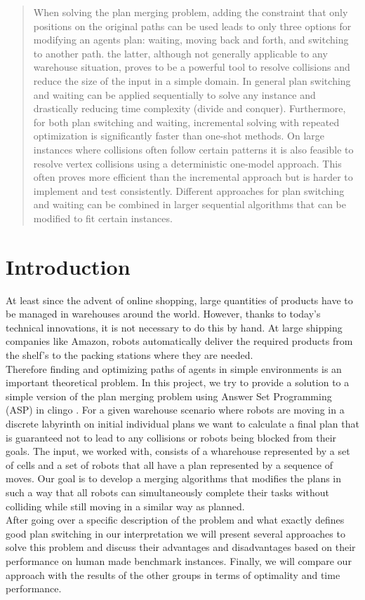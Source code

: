 \documentclass{llncs}
\begin{document}
\tableofcontents
\newpage
\begin{abstract}
When solving the plan merging problem, adding the constraint that only positions on the original paths can be used leads to only three options for modifying an agents plan: waiting, moving back and forth, and switching to another path. the latter, although not generally applicable to any warehouse situation, proves to be a powerful tool to resolve collisions and reduce the size of the input in a simple domain. In general plan switching and waiting can be applied sequentially to solve any instance and drastically reducing time complexity (divide and conquer). Furthermore, for both plan switching and waiting, incremental solving with repeated optimization is significantly faster than one-shot methods. On large instances where collisions often follow certain patterns it is also feasible to resolve vertex collisions using a deterministic one-model approach. This often proves more efficient than the incremental approach but is harder to implement and test consistently. Different approaches for plan switching and waiting can be combined in larger sequential algorithms that can be modified to fit certain instances.
\end{abstract}
\setcounter{page}{1}
\section{Introduction}
At least since the advent of online shopping, large quantities of products have to be managed in warehouses around the world. However, thanks to today's technical innovations, it is not necessary to do this by hand. At large shipping companies like Amazon, robots automatically deliver the required products from the shelf's to the packing stations where they are needed\cite{amazon}.\\
Therefore finding and optimizing paths of agents in simple environments is an important theoretical problem.
In this project, we try to provide a solution to a simple version of the plan merging problem using Answer Set Programming (ASP) in clingo \cite{clingo}. For a given warehouse scenario where robots are moving in a discrete labyrinth on initial individual plans we want to calculate a final plan that is guaranteed not to lead to any collisions or robots being blocked from their goals.
The input, we worked with, consists of a wharehouse represented by a set of cells and a set of robots that all have a plan represented by a sequence of moves. Our goal is to develop a merging algorithms that modifies the plans in such a way that all robots can simultaneously complete their tasks without colliding while still moving in a similar way as planned.  \\
After going over a specific description of the problem and what exactly defines good plan switching in our interpretation we will present several approaches to solve this problem and discuss their advantages and disadvantages based on their performance on human made benchmark instances. Finally, we will compare our approach with the results of the other groups in terms of optimality and time performance. \\
\end{document}
